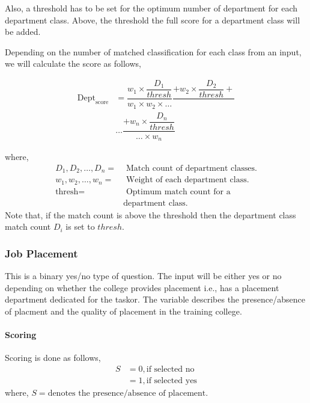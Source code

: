 \documentclass[oneside,twocolumn]{article}
\begin{document}
Also, a threshold has to be set for the optimum number of
department for each department class. Above, the threshold
the full score for a department class will be added.

Depending on the number of matched classification for each
class from an input, we will calculate the score as follows,

\begin{align*}
  \text{Dept}_{\text{score}} &= \dfrac{w_1 \times \dfrac{D_1}{thresh}}{w_1 \times w_2 \times \dots} \dfrac{+ w_2 \times \dfrac{D_2}{thresh} +}{} \\
  &\dots \dfrac{+ w_n \times \dfrac{D_n}{thresh}}{\dots \times w_n}
\end{align*}

where,
\begin{align*}
  D_1, D_2, \dots, D_n =& \text{ Match count of department classes.} \\
  w_1, w_2, \dots, w_n =& \text{ Weight of each department class.} \\
  \text{thresh} =& \text{ Optimum match count for a} \\
                &\text{department class.}
\end{align*}
Note that, if the match count is above the threshold then
the department class match count \(D_i\) is set to \(thresh\).

\subsubsection{Job Placement}
This is a binary yes/no type of question. The input will be
either yes or no depending on whether the college provides
placement i.e., has a placement department dedicated for the
taskor. The variable describes the presence/absence of
placment and the quality of placement in the training college.
\paragraph{Scoring}
Scoring is done as follows,
\begin{align*}
	S &= 0, \text{if selected no} \\
     	  &= 1, \text{if selected yes}
\end{align*}
where, \(S = \text{denotes the presence/absence of placement}\).
\end{document}
